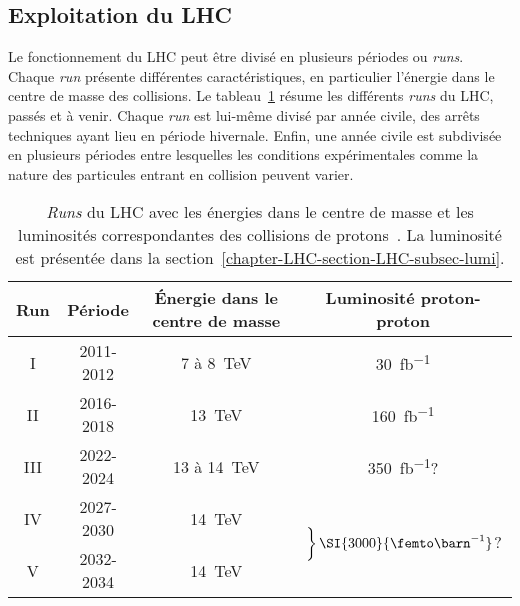 \subsection{Exploitation du LHC}\label{chapter-LHC-section-LHC-subsec-LHC_runs}
Le fonctionnement du LHC peut être divisé en plusieurs périodes ou \emph{runs}.
Chaque \emph{run} présente différentes caractéristiques, en particulier l'énergie dans le centre de masse des collisions.
Le tableau~\ref{tab-LHC_runs} résume les différents \emph{runs} du LHC, passés et à venir.
Chaque \emph{run} est lui-même divisé par année civile, des arrêts techniques ayant lieu en période hivernale.
Enfin, une année civile est subdivisée en plusieurs périodes entre lesquelles les conditions expérimentales comme la nature des particules entrant en collision peuvent varier.
\begin{table}[h]
\centering
\begin{tabular}{cccc}
\toprule
Run & Période & Énergie dans le centre de masse & Luminosité proton-proton\\
\midrule
I & 2011-2012 & 7 à \SI{8}{\TeV} & \SI{30}{\femto\barn^{-1}} \\
II & 2016-2018 & \SI{13}{\TeV} & \SI{160}{\femto\barn^{-1}} \\
III & 2022-2024 & 13 à \SI{14}{\TeV} & \SI{350}{\femto\barn^{-1}}? \\
IV & 2027-2030 & \SI{14}{\TeV} & \multirow{2}{*}{$\displaystyle \left. \vphantom{\text{À}^\text{À}q_q} \right\rbrace \SI{3000}{\femto\barn^{-1}}$?}\\
V & 2032-2034 & \SI{14}{\TeV} & \\
\bottomrule
\end{tabular}
\caption[\emph{Runs} du LHC.]{\emph{Runs} du LHC avec les énergies dans le centre de masse et les luminosités correspondantes des collisions de protons~\cite{LHC_commissioning}. La luminosité est présentée dans la section~\ref{chapter-LHC-section-LHC-subsec-lumi}.}
\label{tab-LHC_runs}
\end{table}
